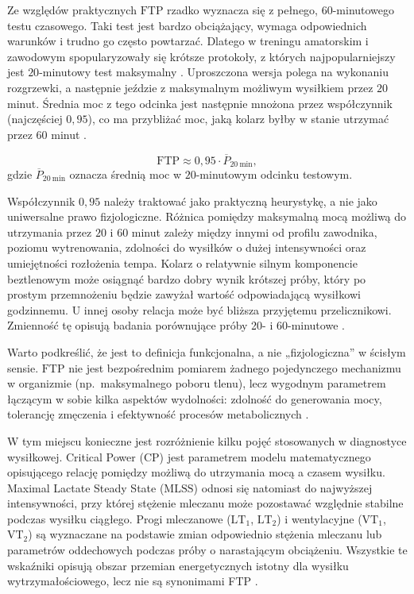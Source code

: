 Ze względów praktycznych $\mathrm{FTP}$ rzadko wyznacza się z pełnego, $60$-minutowego testu czasowego.
Taki test jest bardzo obciążający, wymaga odpowiednich warunków i trudno go często powtarzać.
Dlatego w treningu amatorskim i zawodowym spopularyzowały się krótsze protokoły, z których najpopularniejszy jest $20$-minutowy test maksymalny \parencite{allen2019power}.
Uproszczona wersja polega na wykonaniu rozgrzewki, a następnie jeździe z maksymalnym możliwym wysiłkiem przez $20$ minut.
Średnia moc z tego odcinka jest następnie mnożona przez współczynnik (najczęściej $0{,}95$), co ma przybliżać moc, jaką kolarz byłby w stanie utrzymać przez $60$ minut \parencite{allen2019power,sitko2023_ac20to60_update,inglis2020ftp_mlss}.

\begin{equation}
\label{eq:ftp_20min}
\mathrm{FTP} \approx 0{,}95 \cdot \overline{P}_{20\ \mathrm{min}},
\end{equation}
gdzie $\overline{P}_{20\ \mathrm{min}}$ oznacza średnią moc w $20$-minutowym odcinku testowym.

Współczynnik $0{,}95$ należy traktować jako praktyczną heurystykę, a nie jako uniwersalne prawo fizjologiczne. Różnica pomiędzy maksymalną mocą możliwą do utrzymania przez $20$ i $60$ minut zależy między innymi od profilu zawodnika, poziomu wytrenowania, zdolności do wysiłków o dużej intensywności oraz umiejętności rozłożenia tempa. Kolarz o relatywnie silnym komponencie beztlenowym może osiągnąć bardzo dobry wynik krótszej próby, który po prostym przemnożeniu będzie zawyżał wartość odpowiadającą wysiłkowi godzinnemu. U innej osoby relacja może być bliższa przyjętemu przelicznikowi. Zmienność tę opisują badania porównujące próby 20- i 60-minutowe \parencite{sitko2023_ac20to60_update,gough2025reliability}.

Warto podkreślić, że jest to definicja funkcjonalna, a nie „fizjologiczna” w ścisłym sensie.
$\mathrm{FTP}$ nie jest bezpośrednim pomiarem żadnego pojedynczego mechanizmu w organizmie (np.\ maksymalnego poboru tlenu), lecz wygodnym parametrem łączącym w sobie kilka aspektów wydolności: zdolność do generowania mocy, tolerancję zmęczenia i efektywność procesów metabolicznych \parencite{borszcz2018ftp,karsten2021cpftp}.

W tym miejscu konieczne jest rozróżnienie kilku pojęć stosowanych w diagnostyce wysiłkowej. Critical Power ($\mathrm{CP}$) jest parametrem modelu matematycznego opisującego relację pomiędzy możliwą do utrzymania mocą a czasem wysiłku. Maximal Lactate Steady State ($\mathrm{MLSS}$) odnosi się natomiast do najwyższej intensywności, przy której stężenie mleczanu może pozostawać względnie stabilne podczas wysiłku ciągłego. Progi mleczanowe ($\mathrm{LT}_1$, $\mathrm{LT}_2$) i wentylacyjne ($\mathrm{VT}_1$, $\mathrm{VT}_2$) są wyznaczane na podstawie zmian odpowiednio stężenia mleczanu lub parametrów oddechowych podczas próby o narastającym obciążeniu. Wszystkie te wskaźniki opisują obszar przemian energetycznych istotny dla wysiłku wytrzymałościowego, lecz nie są synonimami FTP \parencite{jones2019mmss,borszcz2018ftp,karsten2021cpftp,mcgrath2021cpftp,jeffries2021ftp_lt,caen2024cp_mlss,chorley2020cpReview,galanRioja2020cpThresholds}.

